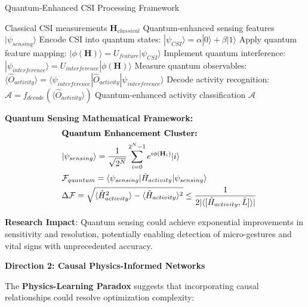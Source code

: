 \documentclass[journal]{IEEEtran}
\begin{document}
\begin{algorithm}[h]
\caption{Quantum-Enhanced CSI Processing Framework}
\label{alg:quantum_csi}
\begin{algorithmic}[1]
\REQUIRE Classical CSI measurements $\mathbf{H}_{classical}$
\ENSURE Quantum-enhanced sensing features $|\psi_{sensing}\rangle$
\STATE Encode CSI into quantum states: $|\psi_{CSI}\rangle = \alpha|0\rangle + \beta|1\rangle$
\STATE Apply quantum feature mapping: $|\phi(\mathbf{H})\rangle = U_{feature}|\psi_{CSI}\rangle$
\STATE Implement quantum interference: $|\psi_{interference}\rangle = U_{interference}|\phi(\mathbf{H})\rangle$
\STATE Measure quantum observables: $\langle\hat{O}_{activity}\rangle = \langle\psi_{interference}|\hat{O}_{activity}|\psi_{interference}\rangle$
\STATE Decode activity recognition: $\mathcal{A} = f_{decode}(\langle\hat{O}_{activity}\rangle)$
\RETURN Quantum-enhanced activity classification $\mathcal{A}$
\end{algorithmic}
\end{algorithm}

\textbf{Quantum Sensing Mathematical Framework:}
\begin{align}
&\hspace{2em} \text{\textbf{Quantum Enhancement Cluster:}} \quad &  \nonumber \\
&\hspace{2em} |\psi_{sensing}\rangle = \frac{1}{\sqrt{2^N}} \sum_{i=0}^{2^N-1} e^{i\phi(\mathbf{H}_i)}|i\rangle \label{eq:quantum_superposition} \\
&\hspace{2em} \mathcal{F}_{quantum} = \langle\psi_{sensing}|\hat{H}_{activity}|\psi_{sensing}\rangle \label{eq:quantum_expectation} \\
&\hspace{2em} \Delta\mathcal{F} = \sqrt{\langle\hat{H}_{activity}^2\rangle - \langle\hat{H}_{activity}\rangle^2} \leq \frac{1}{2|\langle[\hat{H}_{activity}, \hat{L}]\rangle|} \label{eq:quantum_uncertainty}
\end{align}

\textbf{Research Impact}: Quantum sensing could achieve exponential improvements in sensitivity and resolution, potentially enabling detection of micro-gestures and vital signs with unprecedented accuracy.

\textbf{Direction 2: Causal Physics-Informed Networks}

The \textbf{Physics-Learning Paradox} suggests that incorporating causal relationships could resolve optimization complexity:
\end{document}
